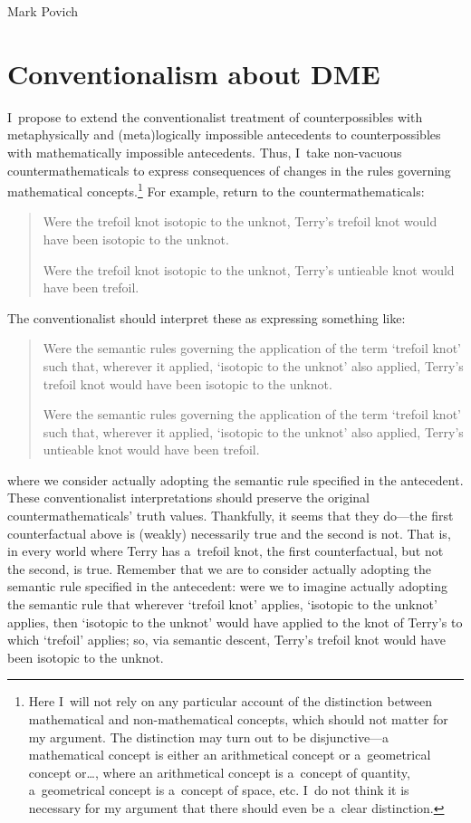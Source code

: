 \begin{artengenv}{Mark Povich}
\section{Conventionalism about DME}
I~propose to extend the conventionalist treatment of counterpossibles with metaphysically and (meta)logically impossible antecedents to counterpossibles with mathematically impossible antecedents. Thus, I~take non-vacuous countermathematicals to express consequences of changes in the rules governing mathematical concepts.\footnote{Here I~will not rely on any particular account of the distinction between mathematical and non-mathematical concepts, which should not matter for my argument. The distinction may turn out to be disjunctive---a mathematical concept is either an arithmetical concept or a~geometrical concept or…, where an arithmetical concept is a~concept of quantity, a~geometrical concept is a~concept of space, etc. I~do not think it is necessary for my argument that there should even be a~clear distinction. } For example, return to the countermathematicals:

\begin{quote}
Were the trefoil knot isotopic to the unknot, Terry's trefoil knot would have been isotopic to the unknot.

Were the trefoil knot isotopic to the unknot, Terry's untieable knot would have been trefoil.
\end{quote}
The conventionalist should interpret these as expressing something like:
\begin{quote}
Were the semantic rules governing the application of the term ‘trefoil knot' such that, wherever it applied, ‘isotopic to the unknot' also applied, Terry's trefoil knot would have been isotopic to the unknot.

Were the semantic rules governing the application of the term ‘trefoil knot' such that, wherever it applied, ‘isotopic to the unknot' also applied, Terry's untieable knot would have been trefoil.
\end{quote}
where we consider actually adopting the semantic rule specified in the antecedent. These conventionalist interpretations should preserve the original countermathematicals' truth values. Thankfully, it seems that they do---the first counterfactual above is (weakly) necessarily true and the second is not. That is, in every world where Terry has a~trefoil knot, the first counterfactual, but not the second, is true. Remember that we are to consider actually adopting the semantic rule specified in the antecedent: were we to imagine actually adopting the semantic rule that wherever ‘trefoil knot' applies, ‘isotopic to the unknot' applies, then ‘isotopic to the unknot' would have applied to the knot of Terry's to which ‘trefoil' applies; so, via semantic descent, Terry's trefoil knot would have been isotopic to the unknot.


\end{artengenv}
